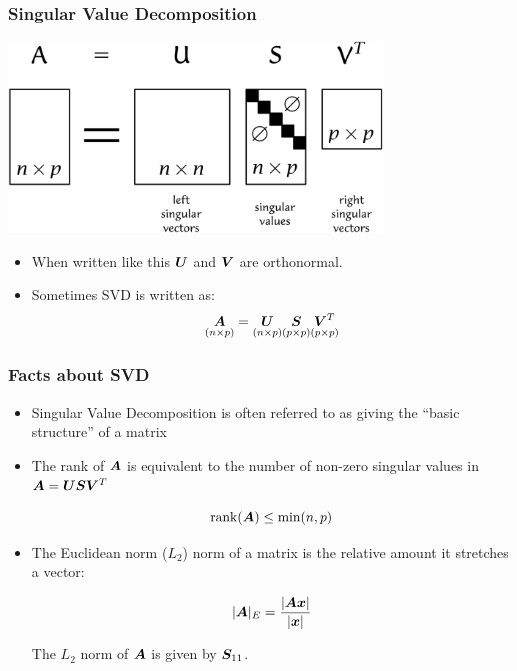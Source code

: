 \documentclass{beamer}
\DeclareMathOperator{\rank}{rank}
\begin{document}



\begin{frame}
  \frametitle{Singular Value Decomposition}

\includegraphics[height=2in]{fig-svd-overview}

\smallskip
\begin{itemize}
  \item When written like this $\bm{U}$ and $\bm{V}$ are orthonormal.

  \item Sometimes SVD is written as:
\[
\underset{(n \times p)}{\bm{A}} = \underset{(n \times p)}{\bm{U}} \underset{(p \times p)}{\bm{S}} \underset{(p \times p)}{\bm{V}^T} 
\]

\end{itemize}


\end{frame}



\begin{frame}
  \frametitle{Facts about SVD}

\begin{itemize}
\item Singular Value Decomposition is often referred to as giving the ``basic structure'' of a matrix

\item The rank of $\bm{A}$ is equivalent to the number of non-zero singular values in $ \bm{A} = \bm{U}\bm{S}\bm{V}^T $

$$ \rank(\Mtx{A}) \leq \min(n,p) $$


\item  The Euclidean norm ($L_2$) norm of a matrix is the relative amount it stretches a vector:

$$ |\bm{A}|_E = \frac{|\bm{A}\bm{x}|}{|\bm{x}|} $$

The $L_2$ norm of $\bm{A}$ is given by $\bm{S}_{11}$.
\end{itemize}



\end{frame}
\end{document}
